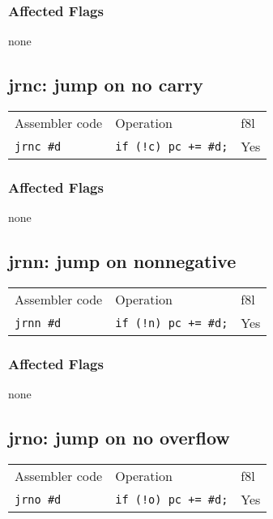 \documentclass{book}
\begin{document}
\subsubsection*{Affected Flags}

none


\subsection{jrnc: jump on no carry}

\begin{tabular}{l l l}
Assembler code    & Operation                    & f8l \\
\texttt{jrnc \#d} & \texttt{if (!c) pc += \#d;} & Yes \\
\end{tabular}

\subsubsection*{Affected Flags}

none


\subsection{jrnn: jump on nonnegative}

\begin{tabular}{l l l}
Assembler code    & Operation                   & f8l \\
\texttt{jrnn \#d} & \texttt{if (!n) pc += \#d;} & Yes \\
\end{tabular}

\subsubsection*{Affected Flags}

none


\subsection{jrno: jump on no overflow}

\begin{tabular}{l l l}
Assembler code    & Operation                   & f8l \\
\texttt{jrno \#d} & \texttt{if (!o) pc += \#d;} & Yes \\
\end{tabular}
\end{document}
